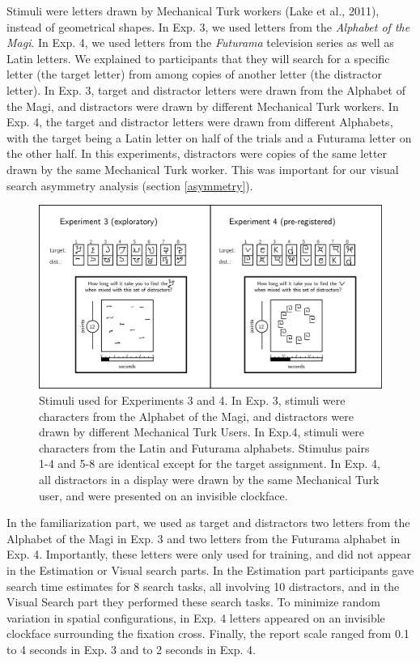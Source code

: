 \documentclass[12pt,twoside]{reedthesis}
\begin{document}
Stimuli were letters drawn by Mechanical Turk workers (Lake et al., 2011), instead of geometrical shapes. In Exp. 3, we used letters from the \emph{Alphabet of the Magi}. In Exp. 4, we used letters from the \emph{Futurama} television series as well as Latin letters. We explained to participants that they will search for a specific letter (the target letter) from among copies of another letter (the distractor letter). In Exp. 3, target and distractor letters were drawn from the Alphabet of the Magi, and distractors were drawn by different Mechanical Turk workers. In Exp. 4, the target and distractor letters were drawn from different Alphabets, with the target being a Latin letter on half of the trials and a Futurama letter on the other half. In this experiments, distractors were copies of the same letter drawn by the same Mechanical Turk worker. This was important for our visual search asymmetry analysis (section \ref{asymmetry}).
\begin{figure}

{\centering \includegraphics[width=1\linewidth]{figure/ch4/methods2} 

}

\caption{Stimuli used for Experiments 3 and 4. In Exp. 3, stimuli were characters from the Alphabet of the Magi, and distractors were drawn by different Mechanical Turk Users. In Exp.4, stimuli were characters from the Latin and Futurama alphabets. Stimulus pairs 1-4 and 5-8 are identical except for the target assignment. In Exp. 4, all distractors in a display were drawn by the same Mechanical Turk user, and were presented on an invisible clockface.}\label{fig:ch4-methods2}
\end{figure}
In the familiarization part, we used as target and distractors two letters from the Alphabet of the Magi in Exp. 3 and two letters from the Futurama alphabet in Exp. 4. Importantly, these letters were only used for training, and did not appear in the Estimation or Visual search parts. In the Estimation part participants gave search time estimates for 8 search tasks, all involving 10 distractors, and in the Visual Search part they performed these search tasks. To minimize random variation in spatial configurations, in Exp. 4 letters appeared on an invisible clockface surrounding the fixation cross. Finally, the report scale ranged from 0.1 to 4 seconds in Exp. 3 and to 2 seconds in Exp. 4.
\end{document}
